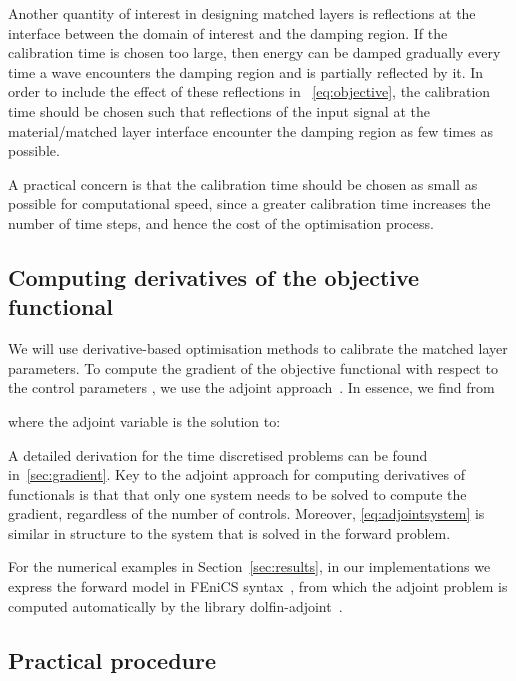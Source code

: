 \documentclass[a4paper]{article}
\begin{document}
Another quantity of interest in designing matched layers is
reflections at the interface between the domain of interest and the
damping region. If the calibration time  is chosen too large,
then energy can be damped gradually every time a wave encounters the
damping region and is partially reflected by it. In order to include
the effect of these reflections in ~\eqref{eq:objective}, the
calibration time should be chosen such that reflections of the input
signal at the material/matched layer interface encounter the damping
region as few times as possible.

A practical concern is that the calibration time should be chosen as
small as possible for computational speed, since a greater calibration
time increases the number of time steps, and hence the cost of the
optimisation process.

\subsection{Computing derivatives of the objective functional}
\label{sec:adjoint}

We will use derivative-based optimisation methods to calibrate the
matched layer parameters. To compute the gradient of the objective
functional  with respect to the control parameters , we
use the adjoint approach~\citep{troeltzsch10}. In essence, we find
 from

where the adjoint variable  is the solution to:

A detailed derivation for the time discretised problems can be found
in~\ref{sec:gradient}.  Key to the adjoint approach for computing
derivatives of functionals is that that only one system needs to be
solved to compute the gradient, regardless of the number of controls.
Moreover, \eqref{eq:adjointsystem} is similar in structure to the
system that is solved in the forward problem.

For the numerical examples in Section~\ref{sec:results}, in our
implementations we express the forward model in FEniCS
syntax~\citep{alnaes:2014, logg10wells, logg12etall}, from which the
adjoint problem is computed automatically by the library
dolfin-adjoint~\citep{funke13farrell}.

\subsection{Practical procedure}
\label{sec:recipe}
\end{document}
